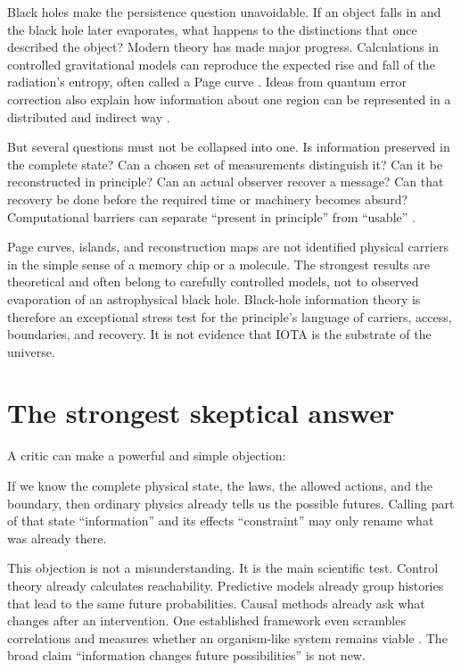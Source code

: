 \documentclass[11pt]{article}
\newcommand{\plainbox}[2]{%
  \begin{center}
  \colorbox{#1}{\parbox{0.92\linewidth}{\vspace{0.35em}#2\vspace{0.35em}}}
  \end{center}}
\begin{document}
Black holes make the persistence question unavoidable. If an object falls in
and the black hole later evaporates, what happens to the distinctions that once
described the object? Modern theory has made major progress. Calculations in
controlled gravitational models can reproduce the expected rise and fall of
the radiation's entropy, often called a Page curve
\citep{Page1993Information,AlmheiriEtAl2019BulkEntropy,PeningtonEtAl2022ReplicaWormholes}.
Ideas from quantum error correction also explain how information about one
region can be represented in a distributed and indirect way
\citep{AlmheiriDongHarlow2015QEC}.

But several questions must not be collapsed into one. Is information preserved
in the complete state? Can a chosen set of measurements distinguish it? Can it
be reconstructed in principle? Can an actual observer recover a message? Can
that recovery be done before the required time or machinery becomes absurd?
Computational barriers can separate ``present in principle'' from ``usable''
\citep{HarlowHayden2013Computation}.

Page curves, islands, and reconstruction maps are not identified physical
carriers in the simple sense of a memory chip or a molecule. The strongest
results are theoretical and often belong to carefully controlled models, not
to observed evaporation of an astrophysical black hole. Black-hole information
theory is therefore an exceptional stress test for the principle's language of
carriers, access, boundaries, and recovery. It is not evidence that IOTA is the
substrate of the universe.

\section*{The strongest skeptical answer}

A critic can make a powerful and simple objection:

\plainbox{icpwarm}{\small
If we know the complete physical state, the laws, the allowed actions, and the
boundary, then ordinary physics already tells us the possible futures.
Calling part of that state ``information'' and its effects ``constraint'' may
only rename what was already there.}

This objection is not a misunderstanding. It is the main scientific test.
Control theory already calculates reachability. Predictive models already
group histories that lead to the same future probabilities. Causal methods
already ask what changes after an intervention. One established framework even
scrambles correlations and measures whether an organism-like system remains
viable \citep{KolchinskyWolpert2018Semantic}. The broad claim ``information
changes future possibilities'' is not new.
\end{document}
